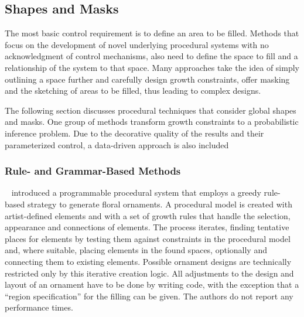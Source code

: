 

\subsection{Shapes and Masks}
\label{subsec:analysis_masks}

The most basic control requirement is to define an area to be filled. Methods that focus on the development of novel underlying procedural systems with no acknowledgment of control mechanisms, also need to define the space to fill and a relationship of the system to that space. Many approaches take the idea of simply outlining a space further and carefully design growth constraints, offer masking and the sketching of areas to be filled, thus leading to complex designs.

The following section discusses procedural techniques that consider global shapes and masks. One group of methods transform growth constraints to a probabilistic inference problem. Due to the decorative quality of the results and their parameterized control, a data-driven approach is also included

\subsubsection{Rule- and Grammar-Based Methods}

\citeauthor*{wong_1998_cgf}~\cite{wong_1998_cgf} introduced a programmable procedural system that employs a greedy rule-based strategy to generate floral ornaments. A procedural model is created with artist-defined elements and with a set of growth rules that handle the selection, appearance and connections of elements. The process iterates, finding tentative places for elements by testing them against constraints in the procedural model and, where suitable, placing elements in the found spaces, optionally and connecting them to existing elements. Possible ornament designs are technically restricted only by this iterative creation logic. All adjustments to the design and layout of an ornament have to be done by writing code, with the exception that a ``region specification'' for the filling can be given. The authors do not report any performance times.


